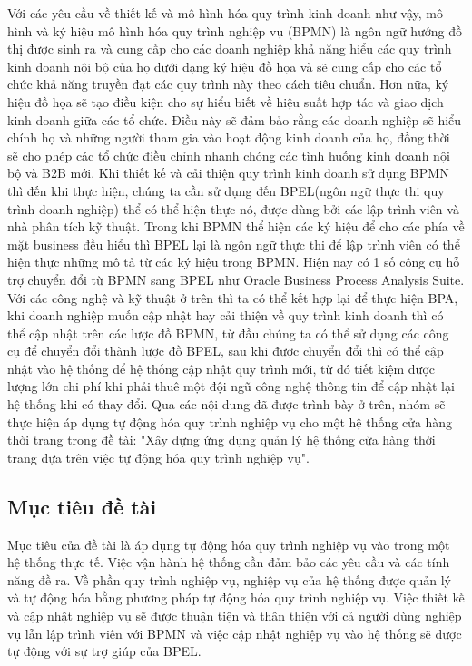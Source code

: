 Với các yêu cầu về thiết kế và mô hình hóa quy trình kinh doanh như vậy, mô hình và ký hiệu mô hình hóa quy trình nghiệp vụ (BPMN) là ngôn ngữ hướng đồ thị được sinh ra và cung cấp cho các doanh nghiệp khả năng hiểu các quy trình kinh doanh nội bộ của họ dưới dạng ký hiệu đồ họa và sẽ cung cấp cho các tổ chức khả năng truyền đạt các quy trình này theo cách tiêu chuẩn. Hơn nữa, ký hiệu đồ họa sẽ tạo điều kiện cho sự hiểu biết về hiệu suất hợp tác và giao dịch kinh doanh giữa các tổ chức. Điều này sẽ đảm bảo rằng các doanh nghiệp sẽ hiểu chính họ và những người tham gia vào hoạt động kinh doanh của họ, đồng thời sẽ cho phép các tổ chức điều chỉnh nhanh chóng các tình huống kinh doanh nội bộ và B2B mới. Khi thiết kế và cải thiện quy trình kinh doanh sử dụng BPMN thì đến khi thực hiện, chúng ta cần sử dụng đến BPEL(ngôn ngữ thực thi quy trình doanh nghiệp) thể có thể hiện thực nó, được dùng bởi các lập trình viên và nhà phân tích kỹ thuật. Trong khi BPMN thể hiện các ký hiệu để cho các phía về mặt business đều hiểu thì BPEL lại là ngôn ngữ thực thi để lập trình viên có thể hiện thực những mô tả từ các ký hiệu trong BPMN. Hiện nay có 1 số công cụ hỗ trợ chuyển đổi từ BPMN sang BPEL như Oracle Business Process Analysis Suite. Với các công nghệ và kỹ thuật ở trên thì ta có thể kết hợp lại để thực hiện BPA, khi doanh nghiệp muốn cập nhật hay cải thiện về quy trình kinh doanh thì có thể cập nhật trên các lược đồ BPMN, từ đầu chúng ta có thể sử dụng các công cụ để chuyển đổi thành lược đồ BPEL, sau khi được chuyển đổi thì có thể cập nhật vào hệ thống để hệ thống cập nhật quy trình mới, từ đó tiết kiệm được lượng lớn chi phí khi phải thuê một đội ngũ công nghệ thông tin để cập nhật lại hệ thống khi có thay đổi. Qua các nội dung đã được trình bày ở trên, nhóm sẽ thực hiện áp dụng tự động hóa quy trình nghiệp vụ cho một hệ thống cửa hàng thời trang trong đề tài: "Xây dựng ứng dụng quản lý hệ thống cửa hàng thời trang dựa trên việc tự động hóa quy trình nghiệp vụ".

\subsection{Mục tiêu đề tài}
\hspace{0.5cm} Mục tiêu của đề tài là áp dụng tự động hóa quy trình nghiệp vụ vào trong một hệ thống thực tế. Việc vận hành hệ thống cần đảm bảo các yêu cầu và các tính năng đề ra. Về phần quy trình nghiệp vụ, nghiệp vụ của hệ thống được quản lý và tự động hóa bằng phương pháp tự động hóa quy trình nghiệp vụ. Việc thiết kế và cập nhật nghiệp vụ sẽ được thuận tiện và thân thiện với cả người dùng nghiệp vụ lẫn lập trình viên với BPMN và việc cập nhật nghiệp vụ vào hệ thống sẽ được tự động với sự trợ giúp của BPEL.

